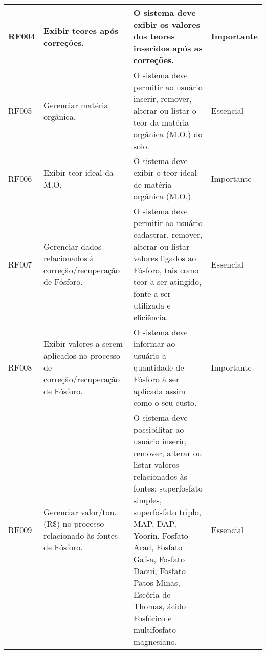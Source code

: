 \begin{longtable}{|p{1.5cm}|p{3cm}|p{7cm}|p{2.5cm}|}
    RF004 & Exibir teores após correções.                                                    & O sistema deve exibir os valores dos teores inseridos após as correções.                                                                                                                                                                                                                                & Importante \\\hline
    RF005 & Gerenciar matéria orgânica.                                                      & O sistema deve permitir ao usuário inserir, remover, alterar ou listar o teor da matéria orgânica (M.O.) do solo.                                                                                                                                                                                       & Essencial  \\\hline
    RF006 & Exibir teor ideal da M.O.                                                        & O sistema deve exibir o teor ideal de matéria orgânica (M.O.).                                                                                                                                                                                                                                          & Importante \\\hline
    RF007 & Gerenciar dados relacionados à correção/recuperação  de Fósforo.                 & O sistema deve permitir ao usuário cadastrar, remover,  alterar ou listar valores ligados ao Fósforo, tais como teor a ser atingido, fonte a ser utilizada e eficiência.                                                                                                                                & Essencial  \\\hline
    RF008 & Exibir valores a serem aplicados no processo de correção/recuperação de Fósforo. & O sistema deve informar ao usuário a quantidade de Fósforo à ser aplicada assim como o seu custo.                                                                                                                                                                                                       & Importante \\\hline
    RF009 & Gerenciar valor/ton. (R\$) no processo relacionado às fontes de Fósforo.         & O sistema deve possibilitar ao usuário inserir, remover, alterar ou listar valores relacionados às fontes: superfosfato simples, superfosfato triplo, MAP, DAP, Yoorin, Fosfato Arad, Fosfato Gafsa, Fosfato Daoui, Fosfato  Patos Minas, Escória de Thomas, ácido Fosfórico e multifosfato magnesiano. & Essencial  \\\hline

\end{longtable}
